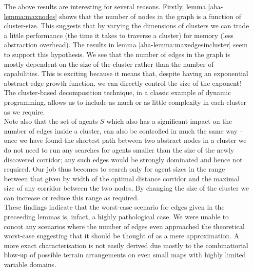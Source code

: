 The above results are interesting for several reasons. 
Firstly, lemma \ref{aha-lemma:maxnodes} shows that the number of nodes in the graph is a function of cluster-size. This suggests that by varying the dimensions of clusters we can trade a little performance (the time it takes to traverse a cluster) for memory (less abstraction overhead).
The results in lemma \ref{aha-lemma:maxedgesincluster} seem to support this hypothesis. We see that the number of edges in the graph is mostly dependent on the size of the cluster rather than the number of capabilities. 
This is exciting because it means that, despite having an exponential abstract edge growth function, we can directly control the size of the exponent! The cluster-based decomposition technique, in a classic example of dynamic programming, allows us to include as much or as little complexity in each cluster as we require.\\ \newline
Note also that the set of agents $S$ which also has a significant impact on the number of edges inside a cluster, can also be controlled in much the same way -- once we have found the shortest path between two abstract nodes in a cluster we do not need to run any searches for agents smaller than the size of the newly discovered corridor; any such edges would be strongly dominated and hence not required. Our job thus becomes to search only for agent sizes in the range between that given by width of the optimal distance corridor and the maximal size of any corridor between the two nodes. By changing the size of the cluster we can increase or reduce this range as required.\\ 
These findings indicate that the worst-case scenario for edges given in the preceeding lemmas is, infact, a highly pathological case. We were unable to concot any scenarios where the number of edges even approached the theoretical worst-case suggesting that it should be thought of as a mere approximation. A more exact characterisation is not easily derived due mostly to the combinatiorial blow-up of possible terrain arrangements on even small maps with highly limited variable domains.
